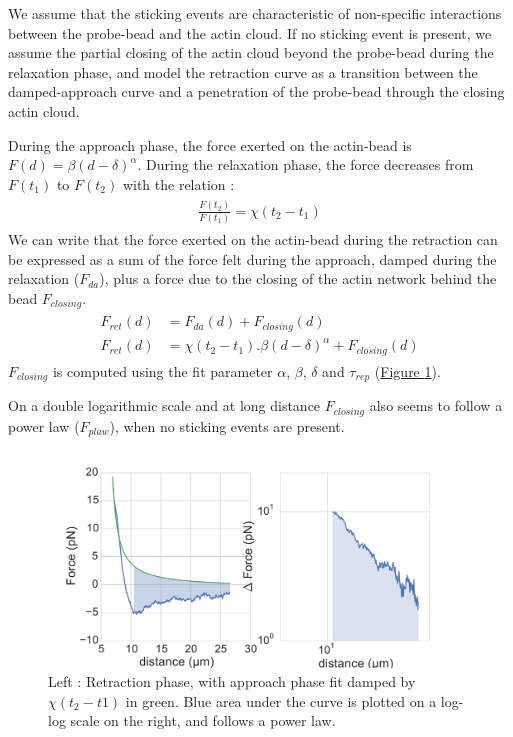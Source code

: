 \documentclass[A4paperpaper,11pt,english]{sphinxmanual}
\begin{document}
We assume that the sticking events are characteristic of non-specific interactions
between the probe-bead and the actin cloud. If no sticking event
is present, we assume the partial closing of the actin cloud beyond the
probe-bead during the relaxation phase, and model the retraction curve as a
transition between the damped-approach curve and a penetration of the probe-bead through the closing actin cloud.

During the approach phase, the force exerted on the actin-bead is
\(F(d)=\beta(d-\delta)^\alpha\). During the relaxation phase, the force
decreases from \(F(t_1)\) to \(F(t_2)\) with the relation :
\label{parts/part3:equation-eqa311}\begin{gather}
\begin{split}\frac{F(t_2)}{F(t_1)} = \chi(t_2-t_1)\end{split}\label{parts/part3-eqa311}
\end{gather}
We can write that the force exerted on the actin-bead during the retraction  can be expressed as a sum of the force felt during the approach, damped during the
relaxation (\(F_{da}\)), plus a force due to the closing of the actin
network behind the bead \(F_{closing}\).
\label{parts/part3:equation-eqa312}\begin{gather}
\begin{split}F_{ret}(d) &= F_{da}(d) + F_{closing}(d)\\
F_{ret}(d) &= \chi(t_2-t_1).\beta(d-\delta)^\alpha+ F_{closing}(d)\end{split}\label{parts/part3-eqa312}
\end{gather}
\(F_{closing}\) is computed using the fit parameter \(\alpha\), \(\beta\), \(\delta\) and \(\tau_{rep}\) (\hyperref[parts/part3:retract-powerlaw]{Figure  \ref*{parts/part3:retract-powerlaw}}).

On a double logarithmic scale and at long distance \(F_{closing}\) also seems to
follow a power law (\(F_{plaw}\)), when no sticking events are present.
\begin{figure}[htbp]
\centering
\capstart

\includegraphics[width=1.000\linewidth]{retract-powerlaw.pdf}
\caption{Left : Retraction phase, with approach phase fit damped by
\(\chi(t_2-t1)\) in green. Blue area under the curve is plotted on a
log-log scale on the right, and follows a power law.}\label{parts/part3:retract-powerlaw}\end{figure}
\end{document}
